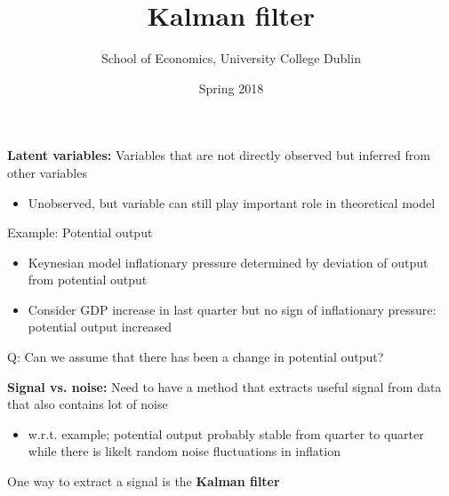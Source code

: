 \documentclass{beamer}
\title{Kalman filter}
\author{School of Economics, University College Dublin}
\date{Spring 2018}
\begin{document}
\begin{frame}
 \titlepage
\end{frame}

\begin{frame}
  \textbf{Latent variables:} Variables that are not directly observed but inferred from other variables
  \begin{itemize}
    \item Unobserved, but variable can still play important role in theoretical model
  \end{itemize}
  \medskip
  Example: Potential output
  \begin{itemize}
    \item Keynesian model inflationary pressure determined by deviation of output from potential output
    \item Consider GDP increase in last quarter but no sign of inflationary pressure: potential output increased
  \end{itemize}  
  \medskip
  Q: Can we assume that there has been a change in potential output?
\end{frame}

\begin{frame}
  \textbf{Signal vs. noise:} Need to have a method that extracts useful signal from data that also contains lot of noise
  \begin{itemize}
     \item w.r.t. example; potential output probably stable from quarter to quarter while there is likelt random noise fluctuations in inflation 
   \end{itemize} 
   \medskip
   One way to extract a signal is the \textbf{Kalman filter}
\end{frame}
\end{document}
